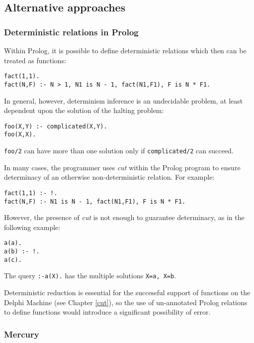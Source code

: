 \subsection{Alternative approaches}

\subsubsection{Deterministic relations in Prolog}

Within Prolog, it is possible to define deterministic relations which then
can be treated as functions:

\begin{verbatim}
fact(1,1).
fact(N,F) :- N > 1, N1 is N - 1, fact(N1,F1), F is N * F1.
\end{verbatim}

In general, however, determinism inference is an undecidable problem, at
least dependent upon the solution of the halting problem:

\begin{verbatim}
foo(X,Y) :- complicated(X,Y).
foo(X,X).
\end{verbatim}

\texttt{foo/2} can have more than one solution only if
\texttt{complicated/2} can succeed.

In many cases, the programmer uses \textit{cut} within the Prolog
program to ensure determinacy of an otherwise non-deterministic
relation. For example:

\begin{verbatim}
fact(1,1) :- !.
fact(N,F) :- N1 is N - 1, fact(N1,F1), F is N * F1.
\end{verbatim}

However, the presence of \textit{cut} is not enough to
guarantee determinacy, as in the following example:

\begin{verbatim}
a(a).
a(b) :- !.
a(c).
\end{verbatim}

The query \texttt{:-a(X).} has the multiple solutions
\texttt{X=a, X=b}.

Deterministic reduction is essential for the successful
support of functions on the Delphi Machine (see Chapter
\ref{cut}), so the use of un-annotated Prolog relations to define
functions would introduce a significant possibility of error.

\subsubsection{Mercury}

